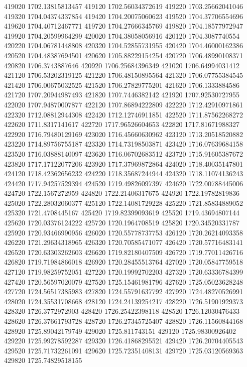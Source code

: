 {419020 1702.13815813457
419120 1702.56034372619
419220 1703.25662041046
419320 1704.04374337854
419420 1704.20075060623
419520 1704.37706554696
419620 1704.40712467771
419720 1704.27666345769
419820 1704.18577972947
419920 1704.20599964299
420020 1704.38058056916
420120 1704.3087740554
420220 1704.06781448808
420320 1704.52855731955
420420 1704.46000162386
420520 1704.48387694501
420620 1705.88229154254
420720 1706.48990108371
420820 1706.3743887646
420920 1706.25684396349
421020 1706.64994031412
421120 1706.53202319125
421220 1706.48150895564
421320 1706.07755384545
421420 1706.00675032525
421520 1706.27829775201
421620 1706.1333884586
421720 1707.20944987493
421820 1707.7446382142
421920 1707.92530727955
422020 1707.94870007877
422120 1707.86894222809
422220 1712.42910971861
422320 1712.08812944308
422420 1712.12746911851
422520 1711.87562268272
422620 1711.8317141617
422720 1717.96526604653
422820 1717.81671988327
422920 1716.79480129169
423020 1716.45660630962
423120 1713.20518520882
423220 1714.89756755187
423320 1714.73198503871
423420 1716.07639684158
423520 1716.03888140097
423620 1716.06702683512
423720 1715.91605387672
423820 1717.17122077206
423920 1717.37969872864
424020 1718.40035147801
424120 1718.42362656232
424220 1718.35687244944
424320 1718.11074136243
424420 1717.94257529394
424520 1719.49826097397
424620 1722.00788445006
424720 1722.1567272959
424820 1722.21406317675
424920 1722.19782819836
425020 1722.28032060377
425120 1722.14081729228
425220 1721.85834889052
425320 1721.4708445167
425420 1719.82399093619
425520 1719.43694807144
425620 1720.03376124222
425720 1720.1964708519
425820 1720.34520331787
425920 1720.93466990956
426020 1720.55778737753
426120 1720.26214093358
426220 1721.29634318965
426320 1720.70585471077
426420 1720.57716483141
426520 1720.63303262603
426620 1719.82180407509
426720 1719.77011426716
426820 1719.71984866018
426920 1720.28455513764
427020 1720.05847759518
427120 1719.98259752051
427220 1720.19992702203
427320 1720.63336784399
427420 1720.56597020079
427520 1725.15461981796
427620 1725.05023628248
427720 1724.56517385983
427820 1724.55791637792
427920 1724.48270526991
428020 1724.35531708668
428120 1724.24139254217
428220 1726.51901929373
428320 1726.3772972903
428420 1726.25422398118
428520 1726.12030476433
428620 1726.37661793728
428720 1726.27345725407
428820 1726.11560844168
428920 1725.89042179749
429020 1725.811743151
429120 1725.98300926402
429220 1725.99278592287
429320 1726.41868295521
429420 1726.20704405543
429520 1725.71732261091
429620 1725.72351408131
429720 1725.03120569363
429820 1725.74829518155
}

